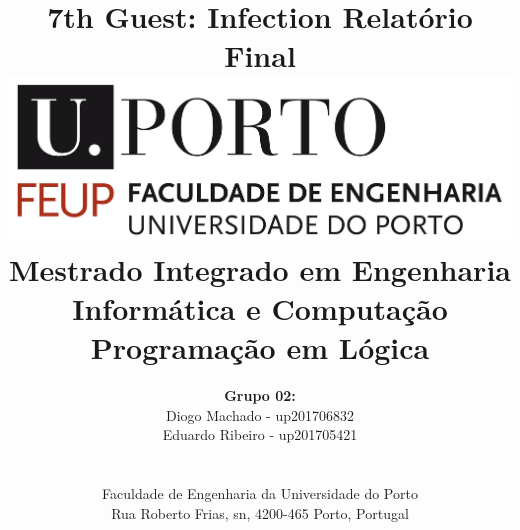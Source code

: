 \documentclass[a4paper]{article}
\begin{document}
\setlength{\textwidth}{16cm}
\setlength{\textheight}{22cm}

\title{\Huge\textbf{7th Guest: Infection}\linebreak\linebreak\linebreak
\Large\textbf{Relatório Final}\linebreak\linebreak
\linebreak\linebreak
\includegraphics[scale=0.1]{feup-logo.png}\linebreak\linebreak
\linebreak\linebreak
\Large{Mestrado Integrado em Engenharia Informática e Computação} \linebreak\linebreak
\Large{Programação em Lógica}\linebreak
}

\author{\textbf{Grupo 02:}\\ Diogo Machado - up201706832 \\ Eduardo Ribeiro - up201705421 \\\linebreak\linebreak \\
 \\ Faculdade de Engenharia da Universidade do Porto \\ Rua Roberto Frias, s\/n, 4200-465 Porto, Portugal \linebreak\linebreak\linebreak
\linebreak\linebreak\vspace{1cm}}
\maketitle
\thispagestyle{empty}
\end{document}
